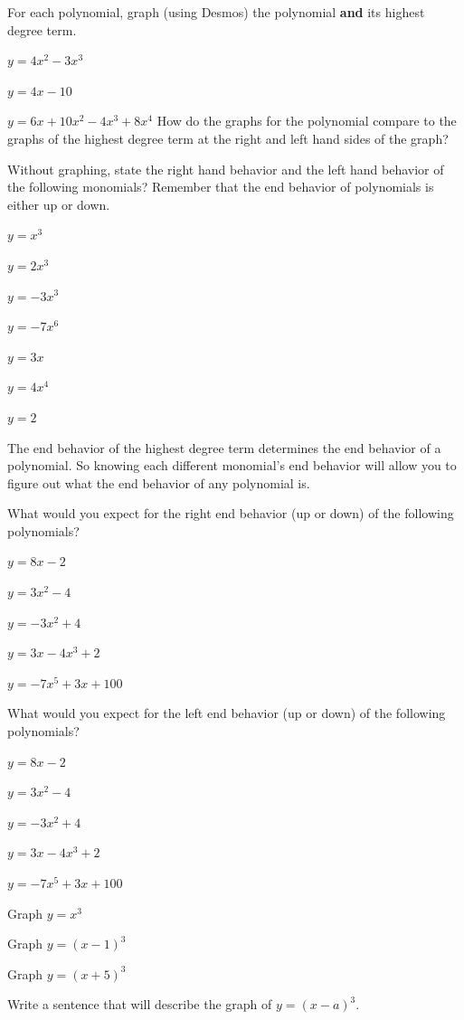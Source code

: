 \eq

\bq For each polynomial, graph (using Desmos) the polynomial \textbf{and} its highest degree term.
\be
\item $y=4x^2-3x^3$
\item $y=4x-10$
\item $y=6x+10x^2-4x^3+8x^4$
\ee
How do the graphs for the polynomial compare to the graphs of the highest degree term at the right and left hand sides of the graph?
\eq

\bq Without graphing, state the right hand behavior and the left hand behavior of the following monomials? Remember that the end behavior of polynomials is either up or down.
\be
\item $y=x^3$
\item $y=2x^3$
\item $y=-3x^3$
\item $y=-7x^6$
\item $y=3x$
\item $y=4x^4$
\item $y=2$
\ee \eq

\begin{info}
The end behavior of the highest degree term determines the end behavior of a polynomial. So knowing each different monomial's end behavior will allow you to figure out what the end behavior of any polynomial is.
\end{info}


\bq What would you expect for the right end behavior (up or down) of the following polynomials?
\be
\item$y= 8x-2$
\item $y=3x^2-4$
\item $y=-3x^2+4$
\item $y=3x-4x^3+2$
\item $y=-7x^5+3x+100$
\ee
\eq

\bq What would you expect for the left end behavior (up or down) of the following polynomials?
\be
\item $y= 8x-2$
\item $y=3x^2-4$
\item $y=-3x^2+4$
\item $y=3x-4x^3+2$
\item $y=-7x^5+3x+100$
\ee
\eq

\bq
\be
\item Graph $y=x^3$
\item Graph $y=(x-1)^3$
\item Graph $y=(x+5)^3$
\item Write a sentence that will describe the graph of $y=(x-a)^3$.
\ee \eq

